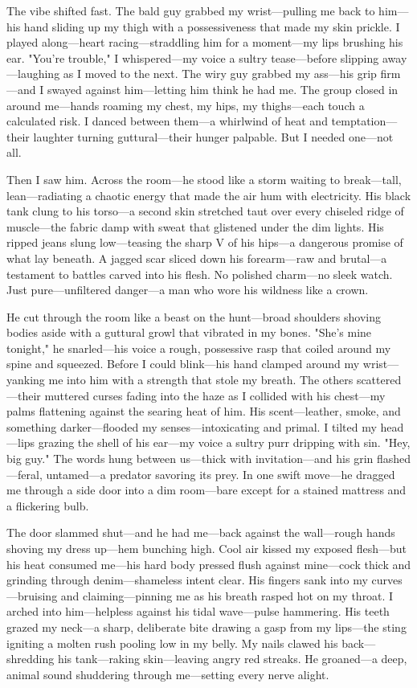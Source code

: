 \documentclass{article}
\begin{document}
The vibe shifted fast. The bald guy grabbed my wrist—pulling me back to him—his hand sliding up my thigh with a possessiveness that made my skin prickle. I played along—heart racing—straddling him for a moment—my lips brushing his ear. "You’re trouble," I whispered—my voice a sultry tease—before slipping away—laughing as I moved to the next. The wiry guy grabbed my ass—his grip firm—and I swayed against him—letting him think he had me. The group closed in around me—hands roaming my chest, my hips, my thighs—each touch a calculated risk. I danced between them—a whirlwind of heat and temptation—their laughter turning guttural—their hunger palpable. But I needed one—not all.

Then I saw him. Across the room—he stood like a storm waiting to break—tall, lean—radiating a chaotic energy that made the air hum with electricity. His black tank clung to his torso—a second skin stretched taut over every chiseled ridge of muscle—the fabric damp with sweat that glistened under the dim lights. His ripped jeans slung low—teasing the sharp V of his hips—a dangerous promise of what lay beneath. A jagged scar sliced down his forearm—raw and brutal—a testament to battles carved into his flesh. No polished charm—no sleek watch. Just pure—unfiltered danger—a man who wore his wildness like a crown.

He cut through the room like a beast on the hunt—broad shoulders shoving bodies aside with a guttural growl that vibrated in my bones. "She’s mine tonight," he snarled—his voice a rough, possessive rasp that coiled around my spine and squeezed. Before I could blink—his hand clamped around my wrist—yanking me into him with a strength that stole my breath. The others scattered—their muttered curses fading into the haze as I collided with his chest—my palms flattening against the searing heat of him. His scent—leather, smoke, and something darker—flooded my senses—intoxicating and primal. I tilted my head—lips grazing the shell of his ear—my voice a sultry purr dripping with sin. "Hey, big guy." The words hung between us—thick with invitation—and his grin flashed—feral, untamed—a predator savoring its prey. In one swift move—he dragged me through a side door into a dim room—bare except for a stained mattress and a flickering bulb.

The door slammed shut—and he had me—back against the wall—rough hands shoving my dress up—hem bunching high. Cool air kissed my exposed flesh—but his heat consumed me—his hard body pressed flush against mine—cock thick and grinding through denim—shameless intent clear. His fingers sank into my curves—bruising and claiming—pinning me as his breath rasped hot on my throat. I arched into him—helpless against his tidal wave—pulse hammering. His teeth grazed my neck—a sharp, deliberate bite drawing a gasp from my lips—the sting igniting a molten rush pooling low in my belly. My nails clawed his back—shredding his tank—raking skin—leaving angry red streaks. He groaned—a deep, animal sound shuddering through me—setting every nerve alight.
\end{document}
